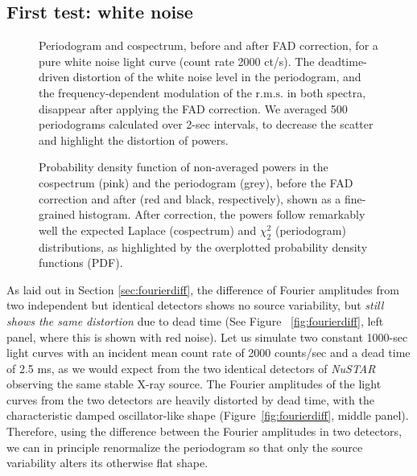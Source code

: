 \documentclass[twocolumn]{aastex61}
\newcommand{\project}[1]{\textsl{#1}}
\newcommand{\nustar}{\project{NuSTAR}\xspace}
\newcommand{\rms}{\ensuremath{\mathrm{r.m.s.}}\xspace}
\begin{document}

\subsection{First test: white noise} \label{sec:wndeadtime}

\begin{figure*}
\caption{Periodogram and cospectrum, before and after FAD correction, for a pure white noise light curve (count rate 2000 ct/s). 
The deadtime-driven distortion of the white noise level in the periodogram, and the frequency-dependent modulation of the \rms in both spectra, disappear after applying the FAD correction. 
We averaged 500 periodograms calculated over 2-sec intervals, to decrease the scatter and highlight the distortion of powers.}
\label{fig:comparison}
\end{figure*}

\begin{figure*}
\caption{Probability density function of non-averaged powers in the cospectrum (pink) and the periodogram (grey), before the FAD correction and after (red and black, respectively), shown as a fine-grained histogram. 
After correction, the powers follow remarkably well the expected Laplace (cospectrum) and $\chi^2_2$ (periodogram) distributions, as highlighted by the overplotted probability density functions (PDF).}
\label{fig:dist}
\end{figure*}

As laid out in Section \ref{sec:fourierdiff}, the difference of Fourier amplitudes from two independent but identical detectors shows no source variability, but \textit{still shows the same distortion} due to dead time (See Figure ~\ref{fig:fourierdiff}, left panel, where this is shown with red noise).
Let us simulate two constant 1000-sec light curves with an incident mean count rate of 2000 counts/sec and a dead time of 2.5 ms, as we would expect from the two identical detectors of \nustar observing the same stable X-ray source.
The Fourier amplitudes of the light curves from the two detectors are heavily distorted by dead time, with the characteristic damped oscillator-like shape \citep{Vikhlinin+94,Zhang+95}  (Figure~\ref{fig:fourierdiff}, middle panel). 
Therefore, using the difference between the Fourier amplitudes in two detectors, we can in principle renormalize the periodogram so that only the source variability alters its otherwise flat shape.
\end{document}
